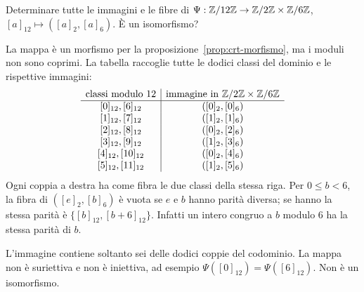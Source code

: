 \begin{esercizio}
Determinare tutte le immagini e le fibre di $\Psi:\mathbb{Z}/12\mathbb{Z}\to\mathbb{Z}/2\mathbb{Z}\times\mathbb{Z}/6\mathbb{Z}$, $[a]_{12}\mapsto([a]_2,[a]_6)$. È un isomorfismo?
\end{esercizio}
\begin{svolgimento}
La mappa è un morfismo per la proposizione~\ref{prop:crt-morfismo}, ma i moduli non sono coprimi. La tabella raccoglie tutte le dodici classi del dominio e le rispettive immagini:
\[
\begin{array}{c|c}
\text{classi modulo }12&\text{immagine in }\mathbb{Z}/2\mathbb{Z}\times\mathbb{Z}/6\mathbb{Z}\\\hline
{[0]_{12}},[6]_{12}&([0]_2,[0]_6)\\
{[1]_{12}},[7]_{12}&([1]_2,[1]_6)\\
{[2]_{12}},[8]_{12}&([0]_2,[2]_6)\\
{[3]_{12}},[9]_{12}&([1]_2,[3]_6)\\
{[4]_{12}},[10]_{12}&([0]_2,[4]_6)\\
{[5]_{12}},[11]_{12}&([1]_2,[5]_6)
\end{array}
\]
Ogni coppia a destra ha come fibra le due classi della stessa riga. Per $0\le b<6$, la fibra di $([e]_2,[b]_6)$ è vuota se $e$ e $b$ hanno parità diversa; se hanno la stessa parità è $\{[b]_{12},[b+6]_{12}\}$. Infatti un intero congruo a $b$ modulo $6$ ha la stessa parità di $b$.

L'immagine contiene soltanto sei delle dodici coppie del codominio. La mappa non è suriettiva e non è iniettiva, ad esempio $\Psi([0]_{12})=\Psi([6]_{12})$. Non è un isomorfismo.
\end{svolgimento}

